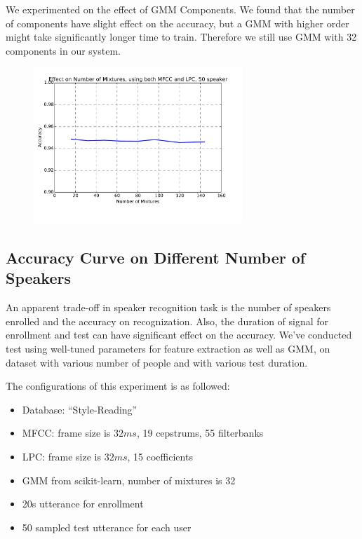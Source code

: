 We experimented on the effect of GMM Components. We found that the number of components
have slight effect on the accuracy, but a GMM with higher order might take
significantly longer time to train. Therefore we still use GMM with 32 components in our system.

\begin{figure}[H]
  \centering
  \includegraphics[width=0.7\textwidth]{img/nmixture.pdf}
\end{figure}

\subsection{Accuracy Curve on Different Number of Speakers}

An apparent trade-off in speaker recognition task is the number of speakers
enrolled and the accuracy on recognization.
Also, the duration of signal for enrollment and test can have significant effect on the accuracy.
We've conducted test using well-tuned parameters for feature extraction as well as GMM, on dataset with
various number of people and with various test duration.

The configurations of this experiment is as followed:
\begin{itemize}
  \item Database: ``Style-Reading''
  \item MFCC: frame size is $32 ms $, 19 cepstrums, 55 filterbanks
  \item LPC: frame size is $32 ms $, 15 coefficients
  \item GMM from scikit-learn, number of mixtures is 32
  \item 20s utterance for enrollment
  \item 50 sampled test utterance for each user
\end{itemize}

